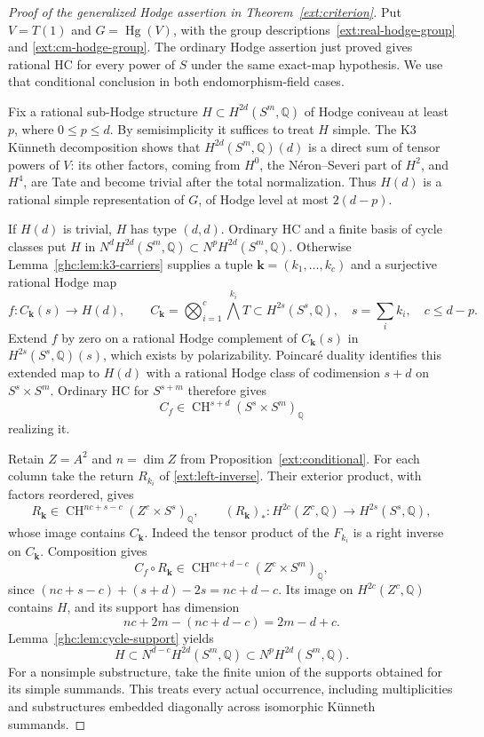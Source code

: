 \documentclass[11pt]{amsart}
\newcommand{\Q}{\mathbb Q}
\DeclareMathOperator{\CH}{CH}
\theoremstyle{definition}
\theoremstyle{remark}
\numberwithin{equation}{section}
\begin{document}
\begin{proof}[Proof of the generalized Hodge assertion in Theorem~\ref{ext:criterion}]
Put $V=T(1)$ and $G=\operatorname{Hg}(V)$, with the group
descriptions~\eqref{ext:real-hodge-group} and
\eqref{ext:cm-hodge-group}.  The ordinary Hodge assertion just proved gives rational HC for every
power of $S$ under the same exact-map hypothesis.  We use that conditional conclusion in
both endomorphism-field cases.

Fix a rational sub-Hodge structure
$H\subset H^{2d}(S^m,\Q)$ of Hodge coniveau at least $p$, where
$0\le p\le d$.  By semisimplicity it suffices to treat $H$ simple.
The K3 K\"unneth decomposition shows that
$H^{2d}(S^m,\Q)(d)$ is a direct sum of tensor powers of $V$:
its other factors, coming from $H^0$, the N\'eron--Severi part
of $H^2$, and $H^4$, are Tate and become trivial after the total
normalization.  Thus $H(d)$ is a rational simple representation
of $G$, of Hodge level at most $2(d-p)$.

If $H(d)$ is trivial, $H$ has type $(d,d)$.  Ordinary HC and a
finite basis of cycle classes put $H$ in
$N^dH^{2d}(S^m,\Q)\subset N^pH^{2d}(S^m,\Q)$.
Otherwise Lemma~\ref{ghc:lem:k3-carriers} supplies a tuple
$\mathbf k=(k_1,\ldots,k_c)$ and a surjective rational Hodge map
\[
 f:C_{\mathbf k}(s)\longrightarrow H(d),\qquad
 C_{\mathbf k}=\bigotimes_{i=1}^c\bigwedge^{k_i}T
       \subset H^{2s}(S^s,\Q),\quad
 s=\sum_i k_i,\quad c\le d-p.
\]
Extend $f$ by zero on a rational Hodge complement of
$C_{\mathbf k}(s)$ in $H^{2s}(S^s,\Q)(s)$, which exists by
polarizability.  Poincar\'e duality identifies this extended map to
$H(d)$ with a rational Hodge class of codimension $s+d$
on $S^s\times S^m$.  Ordinary HC for $S^{s+m}$ therefore gives
\[
 C_f\in\CH^{s+d}(S^s\times S^m)_\Q
\]
realizing it.

Retain $Z=A^2$ and $n=\dim Z$ from
Proposition~\ref{ext:conditional}.  For each column take the return $R_{k_i}$ of
\eqref{ext:left-inverse}.  Their exterior product, with factors
reordered, gives
\[
 R_{\mathbf k}\in\CH^{nc+s-c}(Z^c\times S^s)_\Q,
 \qquad (R_{\mathbf k})_*:H^{2c}(Z^c,\Q)\longrightarrow H^{2s}(S^s,\Q),
\]
whose image contains $C_{\mathbf k}$.  Indeed the tensor product of the
$F_{k_i}$ is a right inverse on $C_{\mathbf k}$.  Composition gives
\[
 C_f\circ R_{\mathbf k}\in\CH^{nc+d-c}(Z^c\times S^m)_\Q,
\]
since $(nc+s-c)+(s+d)-2s=nc+d-c$.
Its image on $H^{2c}(Z^c,\Q)$ contains $H$, and its support has
dimension
\[
 nc+2m-(nc+d-c)=2m-d+c.
\]
Lemma~\ref{ghc:lem:cycle-support} yields
\[
 H\subset N^{d-c}H^{2d}(S^m,\Q)
       \subset N^pH^{2d}(S^m,\Q).
\]
For a nonsimple substructure, take the finite union of the supports
obtained for its simple summands.  This treats every actual
occurrence, including multiplicities and substructures embedded
diagonally across isomorphic K\"unneth summands.


\end{proof}
\end{document}
